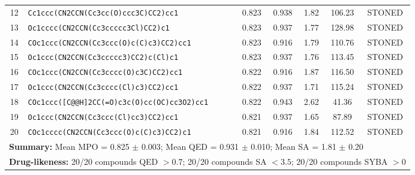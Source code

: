 \documentclass[journal=jcisd8,manuscript=suppinfo]{achemso}
\begin{document}
\begin{table}[htbp]
\begin{tabular}{@{}c p{6cm} c c c c c@{}}
\num{12} & \texttt{Cc1ccc(CN2CCN(Cc3cc(O)ccc3C)CC2)cc1} & \num{0.823} & \num{0.938} & \num{1.82} & \num{106.23} & STONED \\
\num{13} & \texttt{Oc1cccc(CN2CCN(Cc3ccccc3Cl)CC2)c1} & \num{0.823} & \num{0.937} & \num{1.77} & \num{128.98} & STONED \\
\num{14} & \texttt{COc1ccc(CN2CCN(Cc3ccc(O)c(C)c3)CC2)cc1} & \num{0.823} & \num{0.916} & \num{1.79} & \num{110.76} & STONED \\
\num{15} & \texttt{Oc1ccc(CN2CCN(Cc3ccccc3)CC2)c(Cl)c1} & \num{0.823} & \num{0.937} & \num{1.76} & \num{113.45} & STONED \\
\num{16} & \texttt{COc1ccc(CN2CCN(Cc3cccc(O)c3C)CC2)cc1} & \num{0.822} & \num{0.916} & \num{1.87} & \num{116.50} & STONED \\
\num{17} & \texttt{Oc1ccc(CN2CCN(Cc3cccc(Cl)c3)CC2)cc1} & \num{0.822} & \num{0.937} & \num{1.71} & \num{115.24} & STONED \\
\num{18} & \texttt{COc1ccc([C@@H]2CC(=O)c3c(O)cc(OC)cc3O2)cc1} & \num{0.822} & \num{0.943} & \num{2.62} & \num{41.36} & STONED \\
\num{19} & \texttt{Oc1ccc(CN2CCN(Cc3ccc(Cl)cc3)CC2)cc1} & \num{0.821} & \num{0.937} & \num{1.65} & \num{87.89} & STONED \\
\num{20} & \texttt{COc1cccc(CN2CCN(Cc3ccc(O)c(C)c3)CC2)c1} & \num{0.821} & \num{0.916} & \num{1.84} & \num{112.52} & STONED \\
\midrule
\multicolumn{7}{l}{\textbf{Summary:} Mean MPO = \num{0.825} $\pm$ \num{0.003}; Mean QED = \num{0.931} $\pm$ \num{0.010}; Mean SA = \num{1.81} $\pm$ \num{0.20}} \\
\multicolumn{7}{l}{\textbf{Drug-likeness:} \num{20}/\num{20} compounds QED $> \num{0.7}$; \num{20}/\num{20} compounds SA $< \num{3.5}$; \num{20}/\num{20} compounds SYBA $> \num{0}$} \\
\bottomrule
\end{tabular}
\end{table}
\end{document}
